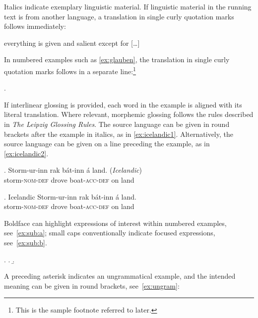 \documentclass{zsarticle}
\begin{document}
Italics indicate exemplary linguistic material. If linguistic material in the running text is from another language, a translation in single curly quotation marks follows immediately:

\begin{zsquote}
[\ldots] everything is given and salient except for   [\ldots]
\end{zsquote}

In numbered examples such as \ref{ex:glauben}, the translation in single curly quotation marks follows in a separate line:\footnote{This is the sample footnote referred to later.\label{fn:sample}}

\ex.\label{ex:glauben} \\

If interlinear glossing is provided, each word in the example is aligned with its literal translation. Where relevant, morphemic glossing follows the rules described in \textit{The Leipzig Glossing Rules}. The source language can be given in round brackets after the example in italics, as in \ref{ex:icelandic1}. Alternatively, the source language can be given on a line preceding the example, as in \ref{ex:icelandic2}.

\ex.\label{ex:icelandic1}
\gll Storm-ur-inn rak b\'{a}t-inn \'{a} land. \hfill (\textit{Icelandic})\\
storm-\textsc{nom}-\textsc{def} drove boat-\textsc{acc}-\textsc{def} on land\\
\glt {}

\ex.\label{ex:icelandic2} \textrm{Icelandic}\vspace{-0.5\baselineskip}
\gll Storm-ur-inn rak b\'{a}t-inn \'{a} land.\\
storm-\textsc{nom}-\textsc{def} drove boat-\textsc{acc}-\textsc{def} on land\\
\glt {}

Boldface can highlight expressions of interest within numbered examples, see~\ref{ex:sub:a}; small caps conventionally indicate focused expressions, see~\ref{ex:sub:b}.

\ex.\label{ex:sub}
\a.\label{ex:sub:a} 
\b.\label{ex:sub:b}  

A preceding asterisk indicates an ungrammatical example, and the intended meaning can be given in round brackets, see~\ref{ex:ungram}:
\end{document}
